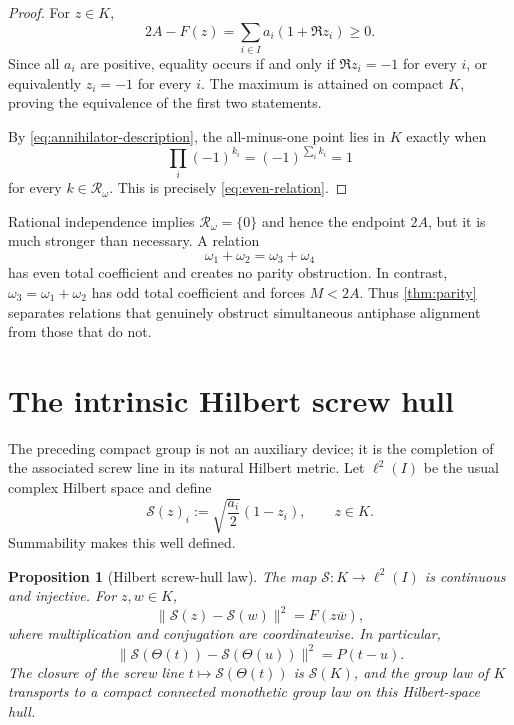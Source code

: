 \documentclass[11pt]{article}
\newtheorem{proposition}[theorem]{Proposition}
\theoremstyle{remark}
\newcommand{\Rel}{\mathcal R}
\begin{document}
\begin{proof}
For $z\in K$,
\begin{equation}\label{eq:ceiling-defect}
 2A-F(z)=\sum_{i\in I}a_i(1+\Re z_i)\geq0.
\end{equation}
Since all $a_i$ are positive, equality occurs if and only if $\Re z_i=-1$ for every $i$, or
equivalently $z_i=-1$ for every $i$.  The maximum is attained on compact $K$, proving the
equivalence of the first two statements.

By \eqref{eq:annihilator-description}, the all-minus-one point lies in $K$ exactly when
\[
 \prod_i(-1)^{k_i}=(-1)^{\sum_i k_i}=1
\]
for every $k\in\Rel_\omega$.  This is precisely \eqref{eq:even-relation}.
\end{proof}

Rational independence implies $\Rel_\omega=\{0\}$ and hence the endpoint $2A$, but it is much
stronger than necessary.  A relation
\[
 \omega_1+\omega_2=\omega_3+\omega_4
\]
has even total coefficient and creates no parity obstruction.  In contrast,
$\omega_3=\omega_1+\omega_2$ has odd total coefficient and forces $M<2A$.  Thus
\cref{thm:parity} separates relations that genuinely obstruct simultaneous antiphase alignment
from those that do not.

\section{The intrinsic Hilbert screw hull}\label{sec:screw-hull}

The preceding compact group is not an auxiliary device; it is the completion of the associated
screw line in its natural Hilbert metric.  Let $\ell^2(I)$ be the usual complex Hilbert space and
define
\begin{equation}\label{eq:S-map}
 \mathcal S(z)_i:=\sqrt{\frac{a_i}{2}}(1-z_i),
 \qquad z\in K.
\end{equation}
Summability makes this well defined.

\begin{proposition}[Hilbert screw-hull law]\label{prop:Hilbert-hull}
The map $\mathcal S:K\to\ell^2(I)$ is continuous and injective.  For $z,w\in K$,
\begin{equation}\label{eq:hull-metric}
 \|\mathcal S(z)-\mathcal S(w)\|^2
 =F(z\overline w),
\end{equation}
where multiplication and conjugation are coordinatewise.  In particular,
\begin{equation}\label{eq:screw-distance}
 \|\mathcal S(\Theta(t))-\mathcal S(\Theta(u))\|^2=P(t-u).
\end{equation}
The closure of the screw line $t\mapsto\mathcal S(\Theta(t))$ is $\mathcal S(K)$, and the group law
of $K$ transports to a compact connected monothetic group law on this Hilbert-space hull.
\end{proposition}
\end{document}
